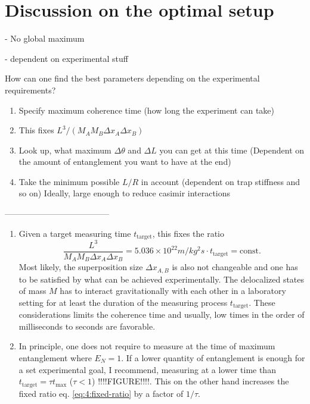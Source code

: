 \section{Discussion on the optimal setup}\label{sec:4:discussion}

- No global maximum

- dependent on experimental stuff

How can one find the best parameters depending on the experimental requirements?
\begin{enumerate}
  \item Specify maximum coherence time (how long the experiment can take)
  \item This fixes $L^3/(M_A M_B \Delta x_A \Delta x_B)$
  \item Look up, what maximum $\Delta \theta$ and $\Delta L$ you can get at this time (Dependent on the amount of entanglement you want to have at the end)
  \item Take the minimum possible $L/R$ in account (dependent on trap stiffness and so on) Ideally, large enough to reduce casimir interactions
\end{enumerate}


-------------------------------------- 

\begin{enumerate}
  \item Given a target measuring time $t_\mathrm{target}$, this fixes the ratio
  \begin{equation}\label{eq:4:fixed-ratio}
    \frac{L^3}{M_A M_B \Delta x_A \Delta x_B} = 5.036\times 10^{22}\si{m/kg^2s} \cdot t_\mathrm{target} = \mathrm{const.}
  \end{equation}
  Most likely, the superposition size $\Delta x_{A,B}$ is also not changeable and one has to be satisfied by what can be achieved experimentally. The delocalized states of mass $M$ has to interact gravitationally with each other in a laboratory setting for at least the duration of the measuring process $t_\mathrm{target}$. These considerations limits the coherence time and usually, low times in the order of milliseconds to seconds are favorable.
  \item In principle, one does not require to measure at the time of maximum entanglement where $E_N = 1$. If a lower quantity of entanglement is enough for a set experimental goal, I recommend, measuring at a lower time than $t_\mathrm{target} = \tau t_\mathrm{max}$ ($\tau < 1$) !!!!FIGURE!!!!. This on the other hand increases the fixed ratio eq. \eqref{eq:4:fixed-ratio} by a factor of $1/\tau$.
\end{enumerate}